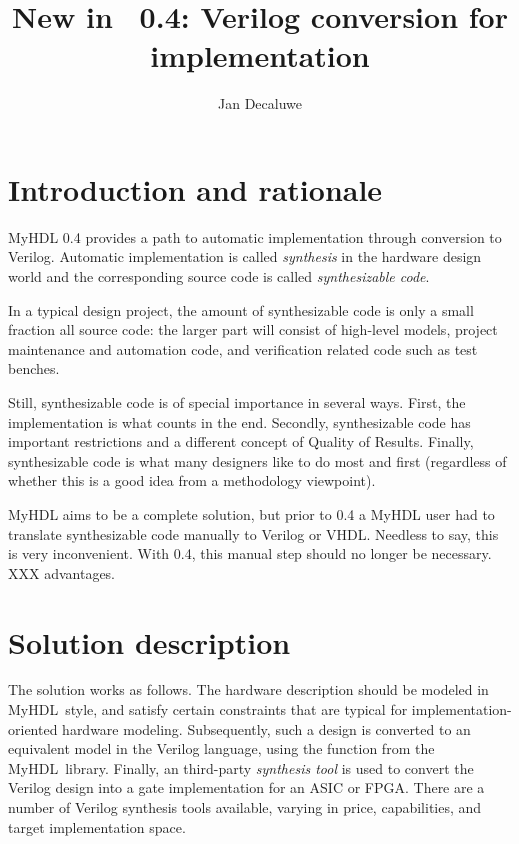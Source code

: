 \documentclass{howto}
\title{New in \myhdl\ 0.4: Verilog conversion for implementation}
\author{Jan Decaluwe}
\newcommand{\myhdl}{\protect \mbox{MyHDL}}
\begin{document}
\maketitle
\tableofcontents


\section{Introduction and rationale\label{section-intro}}

MyHDL 0.4 provides a path to automatic implementation
through conversion to Verilog. Automatic implementation
is called \emph{synthesis} in the hardware design
world and the corresponding source code is called 
\emph{synthesizable code}.

In a typical design project, the amount of synthesizable code is
only a small fraction all source code: the larger part will consist of
high-level models, project maintenance and automation code, and
verification related code such as test benches.

Still, synthesizable code is of special importance in several
ways. First, the implementation is what counts in the end. Secondly,
synthesizable code has important restrictions and a different concept
of Quality of Results. Finally, synthesizable code is what many
designers like to do most and first (regardless of whether this is a
good idea from a methodology viewpoint).

MyHDL aims to be a complete solution, but prior to 0.4 a MyHDL user
had to translate synthesizable code manually to Verilog or
VHDL. Needless to say, this is very inconvenient. With 0.4,
this manual step should no longer be necessary. XXX advantages.

\section{Solution description\label{section-solution}}

The solution works as follows. The hardware description should be
modeled in \myhdl\ style, and satisfy certain constraints
that are typical for implementation-oriented hardware modeling.
Subsequently, such a design is converted to an equivalent model in the
Verilog language, using the function  
from the \myhdl\ library. Finally,
an third-party \emph{synthesis tool} is used to convert the Verilog
design into a gate implementation for an ASIC or FPGA. There are a
number of Verilog synthesis tools available, varying in price,
capabilities, and target implementation space.
\end{document}
